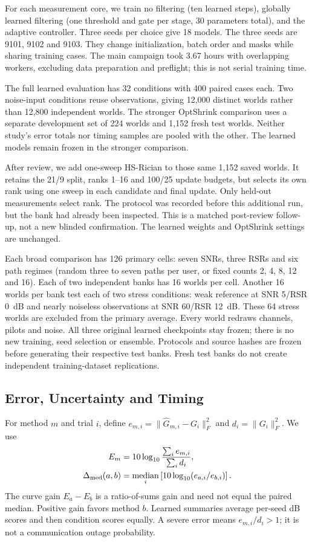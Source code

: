 \documentclass[10pt,journal,letterpaper]{IEEEtran}
\DeclareMathOperator{\median}{median}
\begin{document}
For each measurement core, we train no filtering (ten learned steps), globally learned filtering (one threshold and gate per stage, 30 parameters total), and the adaptive controller. Three seeds per choice give 18 models. The three seeds are 9101, 9102 and 9103. They change initialization, batch order and masks while sharing training cases. The main campaign took 3.67 hours with overlapping workers, excluding data preparation and preflight; this is not serial training time.

The full learned evaluation has 32 conditions with 400 paired cases each. Two noise-input conditions reuse observations, giving 12,000 distinct worlds rather than 12,800 independent worlds. The stronger OptShrink comparison uses a separate development set of 224 worlds and 1,152 fresh test worlds. Neither study's error totals nor timing samples are pooled with the other. The learned models remain frozen in the stronger comparison.

After review, we add one-sweep HS-Rician to those same 1,152 saved worlds. It retains the 21/9 split, ranks 1--16 and 100/25 update budgets, but selects its own rank using one sweep in each candidate and final update. Only held-out measurements select rank. The protocol was recorded before this additional run, but the bank had already been inspected. This is a matched post-review follow-up, not a new blinded confirmation. The learned weights and OptShrink settings are unchanged.

Each broad comparison has 126 primary cells: seven SNRs, three RSRs and six path regimes (random three to seven paths per user, or fixed counts 2, 4, 8, 12 and 16). Each of two independent banks has 16 worlds per cell. Another 16 worlds per bank test each of two stress conditions: weak reference at SNR 5/RSR 0~dB and nearly noiseless observations at SNR 60/RSR 12~dB. These 64 stress worlds are excluded from the primary average. Every world redraws channels, pilots and noise. All three original learned checkpoints stay frozen; there is no new training, seed selection or ensemble. Protocols and source hashes are frozen before generating their respective test banks. Fresh test banks do not create independent training-dataset replications.

\subsection{Error, Uncertainty and Timing}
For method $m$ and trial $i$, define $e_{m,i}=\|\widehat G_{m,i}-G_i\|_F^2$ and $d_i=\|G_i\|_F^2$. We use
\begin{align}
 E_m&=10\log_{10}\frac{\sum_i e_{m,i}}{\sum_i d_i},\label{eq:nmse}\\
 \Delta_{\rm med}(a,b)&=\median_i\left[10\log_{10}(e_{a,i}/e_{b,i})\right].
\end{align}
The curve gain $E_a-E_b$ is a ratio-of-sums gain and need not equal the paired median. Positive gain favors method $b$. Learned summaries average per-seed dB scores and then condition scores equally. A severe error means $e_{m,i}/d_i>1$; it is not a communication outage probability.
\end{document}
